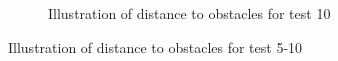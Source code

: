 \documentclass[../Head/Main.tex]{subfiles}
\begin{document}
\begin{figure}[H]
\begin{subfigure}[b]{0.49\textwidth}
    \caption{Illustration of distance to obstacles for test 10}
    \label{fig:MarbleTest10}
  \end{subfigure}
  \caption{Illustration of distance to obstacles for test 5-10}
\end{figure}
\end{document}
